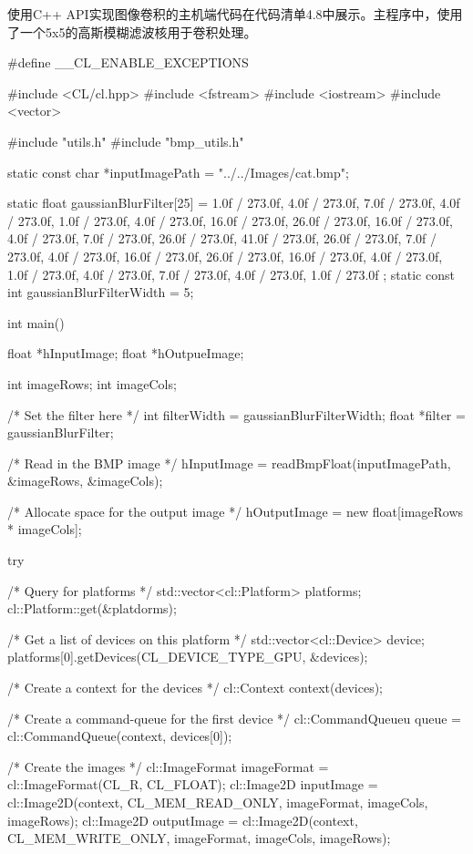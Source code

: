 使用C++ API实现图像卷积的主机端代码在代码清单4.8中展示。主程序中，使用了一个5x5的高斯模糊滤波核用于卷积处理。

\begin{codebox}[cpp]
#define __CL_ENABLE_EXCEPTIONS

#include <CL/cl.hpp>
#include <fstream>
#include <iostream>
#include <vector>

#include "utils.h"
#include "bmp_utils.h"

static const char *inputImagePath = "../../Images/cat.bmp";

static float gaussianBlurFilter[25] = {
  1.0f / 273.0f, 4.0f / 273.0f, 7.0f / 273.0f, 4.0f / 273.0f, 1.0f / 273.0f,
  4.0f / 273.0f, 16.0f / 273.0f, 26.0f / 273.0f, 16.0f / 273.0f, 4.0f / 273.0f,
  7.0f / 273.0f, 26.0f / 273.0f, 41.0f / 273.0f, 26.0f / 273.0f, 7.0f / 273.0f,
  4.0f / 273.0f, 16.0f / 273.0f, 26.0f / 273.0f, 16.0f / 273.0f, 4.0f / 273.0f,
  1.0f / 273.0f, 4.0f / 273.0f, 7.0f / 273.0f, 4.0f / 273.0f, 1.0f / 273.0f
};
static const int gaussianBlurFilterWidth = 5;

int main()
{
  float *hInputImage;
  float *hOutpueImage;

  int imageRows;
  int imageCols;

  /* Set the filter here */
  int filterWidth = gaussianBlurFilterWidth;
  float *filter = gaussianBlurFilter;

  /* Read in the BMP image */
  hInputImage = readBmpFloat(inputImagePath, &imageRows, &imageCols);

  /* Allocate space for the output image */
  hOutputImage = new float[imageRows * imageCols];

  try
  {
    /* Query for platforms */
    std::vector<cl::Platform> platforms;
    cl::Platform::get(&platdorms);

    /* Get a list of devices on this platform */
    std::vector<cl::Device> device;
    platforms[0].getDevices(CL_DEVICE_TYPE_GPU, &devices);

    /* Create a context for the devices */
    cl::Context context(devices);

    /* Create a command-queue for the first device */
    cl::CommandQueueu queue = cl::CommandQueue(context, devices[0]);

    /* Create the images */
    cl::ImageFormat imageFormat = cl::ImageFormat(CL_R, CL_FLOAT);
    cl::Image2D inputImage = cl::Image2D(context, CL_MEM_READ_ONLY,
        imageFormat, imageCols, imageRows);
    cl::Image2D outputImage = cl::Image2D(context,
        CL_MEM_WRITE_ONLY,
        imageFormat, imageCols, imageRows);

}}
\end{codebox}
